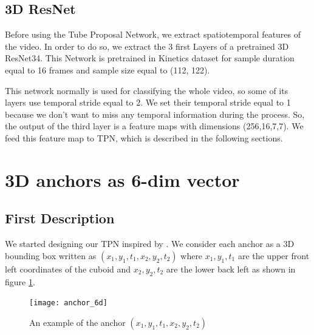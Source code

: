 \subsection{3D ResNet}
Before using the Tube Proposal Network, we extract spatiotemporal features of the video. In order to do so, we extract the 3 first Layers of a
pretrained 3D ResNet34. This Network is pretrained in Kinetics dataset \cite{DBLP:journals/corr/KayCSZHVVGBNSZ17} for sample duration
equal to 16  frames and sample size equal to (112, 122). \par
This network normally is used for classifying the whole video, so some of its layers use temporal stride equal to 2.
We set their temporal stride equal to 1 because we don't want to miss any temporal information during the process.
So, the output of the third layer is a feature maps with dimensions (256,16,7,7). We feed this feature map to TPN, which is described
in the following sections.

\section{ 3D anchors as 6-dim vector}
\subsection{First Description}
We started designing our TPN inspired by \cite{DBLP:journals/corr/HouCS17}. We consider each anchor as a 3D bounding box written as
$(x_1, y_1, t_1, x_2, y_2, t_2)$ where $x_1, y_1, t_1$
are the upper front left coordinates of the cuboid and $x_2, y_2, t_2$ are the lower back left as shown in figure \ref{fig:anchor_6d}.
\begin{figure}[h]
  \centering
  \texttt{[image: anchor\_6d]}
  \caption{An example of the anchor $(x_1,y_1,t_1,x_2,y_2,t_2)$}
  \label{fig:anchor_6d}
\end{figure}

